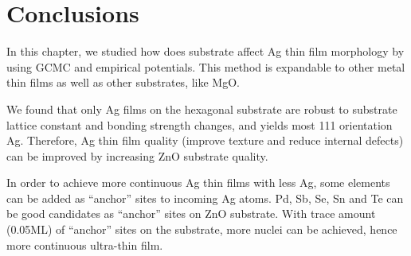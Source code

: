 \section{Conclusions}
In this chapter, we studied how does substrate affect Ag thin film morphology by using \ac{GCMC} and empirical potentials. This method is expandable to other metal thin films as well as other substrates, like MgO.

We found that only Ag films on the hexagonal substrate are robust to substrate lattice constant and bonding strength changes, and yields most {111} orientation Ag. Therefore, Ag thin film quality (improve texture and reduce internal defects) can be improved by increasing ZnO substrate quality. 

In order to achieve more continuous Ag thin films with less Ag, some elements can be added as ``anchor'' sites to incoming Ag atoms. Pd, Sb, Se, Sn and Te can be good candidates as ``anchor'' sites on ZnO substrate. With trace amount (0.05\ac{ML}) of ``anchor'' sites on the substrate, more nuclei can be achieved, hence more continuous ultra-thin film.